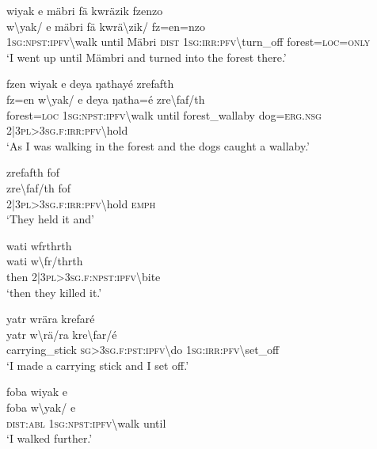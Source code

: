 \ea\label{ex:13:a1293}
wiyak e mäbri fä kwräzik fzenzo\\
\gll w{\textbackslash}yak/	e	mäbri	fä	kwrä{\textbackslash}zik/	fz=en=nzo\\
     1\textsc{sg}:\textsc{npst}:\textsc{ipfv}{\textbackslash}walk	until	Mäbri	\textsc{dist}	1\textsc{sg}:\textsc{irr}:\textsc{pfv}{\textbackslash}turn\_off	forest=\textsc{loc}=\textsc{only}\\
\glt `I went up until Mämbri and turned into the forest there.'
\z

\ea\label{ex:13:a1295}
fzen wiyak e deya ŋathayé zrefafth\\
\gll fz=en	w{\textbackslash}yak/	e	deya	ŋatha=é	zre{\textbackslash}faf/th\\
     forest=\textsc{loc}	1\textsc{sg}:\textsc{npst}:\textsc{ipfv}{\textbackslash}walk	until	forest\_wallaby	dog=\textsc{erg}.\textsc{nsg}	2|3\textsc{pl}>3\textsc{sg}.\textsc{f}:\textsc{irr}:\textsc{pfv}{\textbackslash}hold\\
\glt `As I was walking in the forest and the dogs caught a wallaby.'
\z

\ea\label{ex:13:a1296}
zrefafth fof\\
\gll zre{\textbackslash}faf/th	fof\\
     2|3\textsc{pl}>3\textsc{sg}.\textsc{f}:\textsc{irr}:\textsc{pfv}{\textbackslash}hold	\textsc{emph}\\
\glt `They held it and'
\z

\ea\label{ex:13:a1297}
wati wfrthrth\\
\gll wati	w{\textbackslash}fr/thrth\\
     then	2|3\textsc{pl}>3\textsc{sg}.\textsc{f}:\textsc{npst}:\textsc{ipfv}{\textbackslash}bite\\
\glt `then they killed it.'
\z

\ea\label{ex:13:a1298}
yatr wrära krefaré\\
\gll yatr	w{\textbackslash}rä/ra	kre{\textbackslash}far/é\\
     carrying\_stick	\textsc{sg}>3\textsc{sg}.\textsc{f}:\textsc{pst}:\textsc{ipfv}{\textbackslash}do	1\textsc{sg}:\textsc{irr}:\textsc{pfv}{\textbackslash}set\_off\\
\glt `I made a carrying stick and I set off.'
\z

\ea\label{ex:13:a1300}
foba wiyak e\\
\gll foba	w{\textbackslash}yak/	e\\
     \textsc{dist}:\textsc{abl}	1\textsc{sg}:\textsc{npst}:\textsc{ipfv}{\textbackslash}walk	until\\
\glt `I walked further.'
\z


